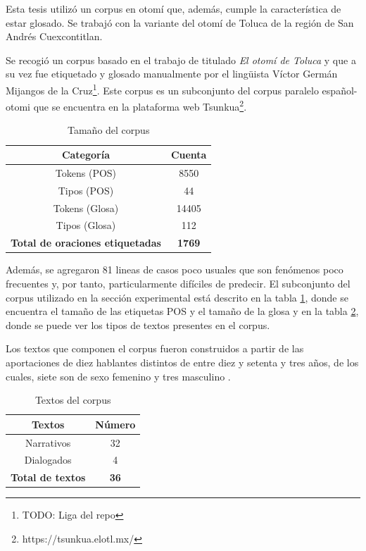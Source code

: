 \documentclass[letterpaper,12pt,oneside]{book}
\theoremstyle{definition}
\begin{document}
Esta  tesis utilizó un corpus en otomí que, además, cumple la característica de estar glosado. Se trabajó con la variante del otomí de Toluca de la región de San Andrés Cuexcontitlan.

Se recogió un corpus basado en el trabajo de \citet{lastra1992otomi} titulado \emph{El otomí de Toluca} y que a su vez fue etiquetado y glosado manualmente por el lingüista Víctor Germán Mijangos de la Cruz\footnote{TODO: Liga del repo}. Este corpus es un subconjunto del corpus paralelo español-otomi que se encuentra en la plataforma web Tsunkua\footnote{https://tsunkua.elotl.mx/}.


\begin{table}
	\centering
	\begin{tabular}{| c | c |}\hline
		\textbf{Categoría} & \textbf{Cuenta} \\ \hline
		Tokens (POS) & 8550\\
		Tipos (POS) & 44\\
		Tokens (Glosa) & 14405\\
		Tipos (Glosa) & 112\\
		\textbf{Total de oraciones etiquetadas} & \textbf{1769} \\ \hline
	\end{tabular}
	\caption{Tamaño del corpus}
	\label{table:corpus_length:1}
\end{table}

Además, se agregaron 81 lineas de casos poco usuales que son fenómenos poco frecuentes y, por tanto, particularmente difíciles de predecir. El subconjunto del corpus utilizado en la sección experimental está descrito en la tabla \ref{table:corpus_length:1}, donde se encuentra el tamaño de las etiquetas POS y el tamaño de la glosa y en la tabla \ref{table:corpus_text:1}, donde se puede ver los tipos de textos presentes en el corpus.

Los textos que componen el corpus fueron construidos a partir de las aportaciones de diez hablantes distintos de entre diez y setenta y tres años, de los cuales, siete son de sexo femenino y tres masculino \citep{lastra1992otomi}.

\begin{table}
	\centering
	\begin{tabular}{| c | c |}\hline
		\textbf{Textos} & \textbf{Número} \\ \hline
		Narrativos & 32 \\
		Dialogados & 4  \\
		\textbf{Total de textos}  & \textbf{36} \\\hline
	\end{tabular}
	\caption{Textos del corpus}
	\label{table:corpus_text:1}
\end{table}
\end{document}
